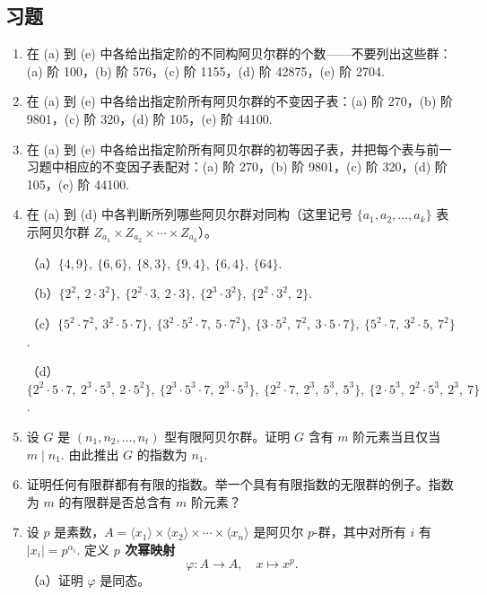 \subsection*{习题}

\begin{enumerate}
\item 在 (a) 到 (e) 中各给出指定阶的不同构阿贝尔群的个数——不要列出这些群：(a) 阶 100，(b) 阶 576，(c) 阶 1155，(d) 阶 42875，(e) 阶 2704.

\item 在 (a) 到 (e) 中各给出指定阶所有阿贝尔群的不变因子表：(a) 阶 270，(b) 阶 9801，(c) 阶 320，(d) 阶 105，(e) 阶 44100.

\item 在 (a) 到 (e) 中各给出指定阶所有阿贝尔群的初等因子表，并把每个表与前一习题中相应的不变因子表配对：(a) 阶 270，(b) 阶 9801，(c) 阶 320，(d) 阶 105，(e) 阶 44100.

\item 在 (a) 到 (d) 中各判断所列哪些阿贝尔群对同构（这里记号 \(\{a_1, a_2, \ldots, a_k\}\) 表示阿贝尔群 \(Z_{a_1} \times Z_{a_2} \times \cdots \times Z_{a_k}\)）。

（a）\(\{4, 9\},\ \{6, 6\},\ \{8, 3\},\ \{9, 4\},\ \{6, 4\},\ \{64\}\).

（b）\(\{2^2,\ 2 \cdot 3^2\},\ \{2^2 \cdot 3,\ 2 \cdot 3\},\ \{2^3 \cdot 3^2\},\ \{2^2 \cdot 3^2,\ 2\}\).

（c）\(\{5^2 \cdot 7^2,\ 3^2 \cdot 5 \cdot 7\},\ \{3^2 \cdot 5^2 \cdot 7,\ 5 \cdot 7^2\},\ \{3 \cdot 5^2,\ 7^2,\ 3 \cdot 5 \cdot 7\},\ \{5^2 \cdot 7,\ 3^2 \cdot 5,\ 7^2\}\).

（d）\(\{2^2 \cdot 5 \cdot 7,\ 2^3 \cdot 5^3,\ 2 \cdot 5^2\},\ \{2^3 \cdot 5^3 \cdot 7,\ 2^3 \cdot 5^3\},\ \{2^2 \cdot 7,\ 2^3,\ 5^3,\ 5^3\},\ \{2 \cdot 5^3,\ 2^2 \cdot 5^3,\ 2^3,\ 7\}\).

\item 设 \(G\) 是 \((n_1, n_2, \ldots, n_t)\) 型有限阿贝尔群。证明 \(G\) 含有 \(m\) 阶元素当且仅当 \(m \mid n_1\). 由此推出 \(G\) 的指数为 \(n_1\).

\item 证明任何有限群都有有限的指数。举一个具有有限指数的无限群的例子。指数为 \(m\) 的有限群是否总含有 \(m\) 阶元素？

\item 设 \(p\) 是素数，\(A = \langle x_1 \rangle \times \langle x_2 \rangle \times \cdots \times \langle x_n \rangle\) 是阿贝尔 \(p\)-群，其中对所有 \(i\) 有 \(|x_i| = p^{\alpha_i}\). 定义 \textbf{\(p\) 次幂映射}
\[
\varphi : A \to A, \quad x \mapsto x^p.
\]
（a）证明 \(\varphi\) 是同态。


\end{enumerate}
